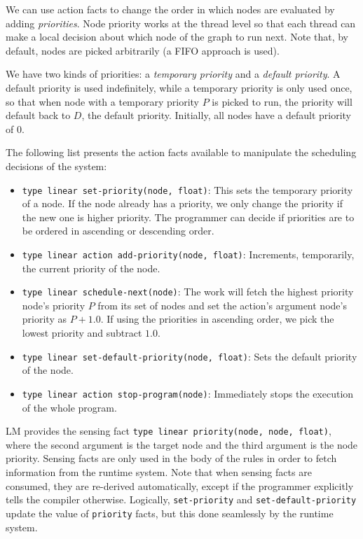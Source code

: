 We can use action facts to change the order in which nodes are evaluated by adding
\emph{priorities}. Node priority works at the thread level
so that each thread can make a local decision about which node of the graph to run next.
Note that, by default, nodes are picked arbitrarily (a FIFO approach is used).

We have two kinds of priorities: a \emph{temporary priority} and a \emph{default
priority}. A default priority is used indefinitely, while a temporary priority
is only used once, so that when node with a temporary priority $P$ is picked to
run, the priority will default back to $D$, the default priority. Initially,
all nodes have a default priority of $0$.

The following list presents the action facts available to manipulate the scheduling
decisions of the system:

\begin{itemize}
   \item \texttt{type linear set-priority(node, float)}: This sets the
   temporary priority of a node. If the node already has a priority, we only
   change the priority if the new one is higher priority. The programmer can
   decide if priorities are to be ordered in ascending or descending order.
   \item \texttt{type linear action add-priority(node, float)}: Increments,
   temporarily, the current priority of the node.
   \item\texttt{type linear schedule-next(node)}: The work will fetch the
   highest priority node's priority $P$ from its set of nodes and set the
   action's argument node's priority as $P + 1.0$. If using the priorities in
   ascending order, we pick the lowest priority and subtract $1.0$.
   \item\texttt{type linear set-default-priority(node, float)}: Sets the default
   priority of the node.
   \item \texttt{type linear action stop-program(node)}: Immediately stops the
   execution of the whole program.
\end{itemize}

LM provides the sensing fact \texttt{type linear priority(node, node, float)},
where the second argument is the target node and the third argument is the
node priority. Sensing facts are only used in the body of the rules in order
to fetch information from the runtime system.
Note that when sensing facts are consumed, they are re-derived automatically,
except if the programmer explicitly tells the compiler otherwise. 
Logically, \texttt{set-priority} and \texttt{set-default-priority} update the
value of \texttt{priority} facts, but this done seamlessly by the runtime
system.

